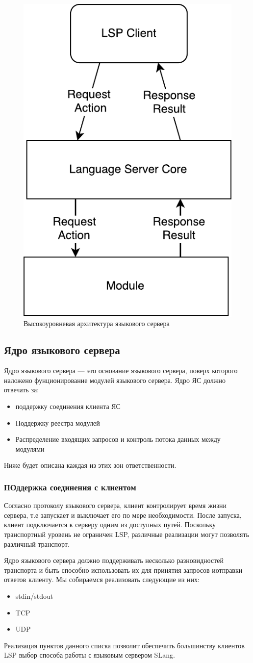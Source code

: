 \begin{figure}[H]
    \centering
    \includegraphics[width=.3\textwidth]{figs/highlevel_architecture.pdf}
    \caption{Высокоуровневая архитектура языкового сервера}
    \label{fig:met:ls_highlevel_arch}
\end{figure}

\subsection{Ядро языкового сервера}
\label{sec:met:arch:core}
Ядро языкового сервера --- это основание языкового сервера, поверх которого наложено фунционирование модулей языкового сервера. Ядро ЯС должно отвечать за:
\begin{itemize}
    \item поддержку соединения клиента ЯС
    \item Поддержку реестра модулей
    \item Распределение входящих запросов и контроль потока данных между модулями
\end{itemize}

Ниже будет описана каждая из этих зон ответственности.

\subsubsection{ПОддержка соединения с клиентом}
\label{sec:met:arch:core:connection_maintenance}
Согласно протоколу языкового сервера\cite{Sourcegraph}, клиент контролирует время жизни сервера, т.е запускает и выключает его по мере необходимости. После запуска, клиент подключается к серверу одним из доступных путей. Поскольку транспортный уровень не ограничен LSP, различные реализации могут позволять различный транспорт.

Ядро языкового сервера должно поддерживать несколько разновидностей транспорта и быть способно использовать их для принятия запросов иотправки ответов клиенту. Мы собираемся реализовать следующие из них:
\begin{itemize}
    \item stdin/stdout
    \item TCP
    \item UDP
\end{itemize}
Реализация пунктов данного списка позволит обеспечить большинству клиентов LSP выбор способа работы с языковым сервером SLang.


